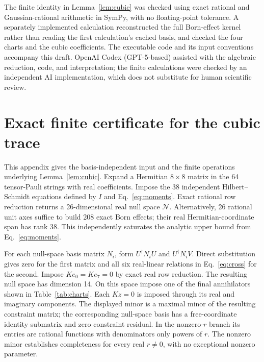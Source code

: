 \documentclass[aps,pra,reprint,onecolumn,superscriptaddress]{revtex4-2}
\newcommand{\NN}{\mathcal N}
\begin{document}
The finite identity in Lemma~\ref{lem:cubic} was checked using exact rational and Gaussian-rational arithmetic in SymPy, with no floating-point tolerance. A separately implemented calculation reconstructed the full Born-effect kernel rather than reading the first calculation's cached basis, and checked the four charts and the cubic coefficients. The executable code and its input conventions accompany this draft. OpenAI Codex (GPT-5-based) assisted with the algebraic reduction, code, and interpretation; the finite calculations were checked by an independent AI implementation, which does not substitute for human scientific review.

\appendix
\section{Exact finite certificate for the cubic trace}\label{app:certificate}

This appendix gives the basis-independent input and the finite operations underlying Lemma~\ref{lem:cubic}. Expand a Hermitian \(8\times8\) matrix in the 64 tensor-Pauli strings with real coefficients. Impose the 38 independent Hilbert--Schmidt equations defined by \(I\) and Eq.~\eqref{eq:moments}. Exact rational row reduction returns a 26-dimensional real null space \(\NN\). Alternatively, 26 rational unit axes suffice to build 208 exact Born effects; their real Hermitian-coordinate span has rank 38. This independently saturates the analytic upper bound from Eq.~\eqref{eq:moments}.

For each null-space basis matrix \(N_i\), form \(U^\dagger N_iU\) and \(U^\dagger N_iV\). Direct substitution gives zero for the first matrix and all six real-linear relations in Eq.~\eqref{eq:cross} for the second. Impose \(Ke_0=Ke_7=0\) by exact real row reduction. The resulting null space has dimension 14. On this space impose one of the final annihilators shown in Table~\ref{tab:charts}. Each \(Kz=0\) is imposed through its real and imaginary components. The displayed minor is a maximal minor of the resulting constraint matrix; the corresponding null-space basis has a free-coordinate identity submatrix and zero constraint residual. In the nonzero-\(r\) branch its entries are rational functions with denominators only powers of \(r\). The nonzero minor establishes completeness for every real \(r\ne0\), with no exceptional nonzero parameter.
\end{document}
